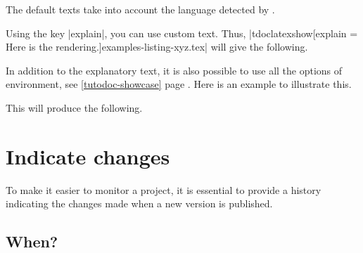\begin{tdocnote}
    The default texts take into account the language detected by \thisproj.
\end{tdocnote}




\begin{tdocexa}
    Using the key \tdoclatexin|explain|, you can use custom text. Thus, \tdoclatexin|tdoclatexshow[explain = Here is the rendering.]{examples-listing-xyz.tex}| will give the following.

    \medskip

    \begin{tdocshowcaseDOC}

    \end{tdocshowcaseDOC}
\end{tdocexa}




\begin{tdocexa}
    In addition to the explanatory text, it is also possible to use all the options of  environment, see \ref{tutodoc-showcase} page \pageref{tutodoc-showcase}.
    Here is an example to illustrate this.

    \medskip



    \medskip

    This will produce the following.

    \medskip

    \begin{tdocshowcaseDOC}
        

    \end{tdocshowcaseDOC}
\end{tdocexa}


\section{Indicate changes}
\label{tutodoc-changes}

To make it easier to monitor a project, it is essential to provide a history indicating the changes made when a new version is published.



\subsection{When?}
\label{tutodoc-changes-when}

